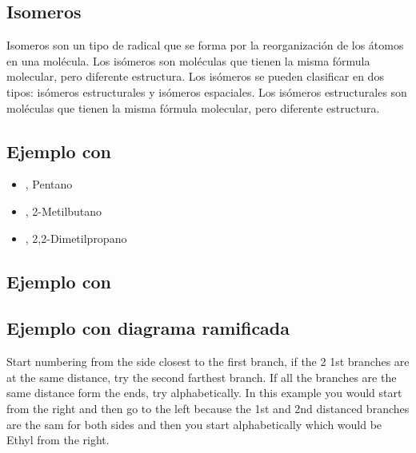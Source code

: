 \subsection{Isomeros}
Isomeros son un tipo de radical que se forma por la reorganización de los átomos en una molécula. Los isómeros son moléculas que tienen la misma fórmula molecular, pero diferente estructura. Los isómeros se pueden clasificar en dos tipos: isómeros estructurales y isómeros espaciales. Los isómeros estructurales son moléculas que tienen la misma fórmula molecular, pero diferente estructura.
\subsection*{Ejemplo con }
\begin{itemize}
    \item {}, Pentano
    \item {}, 2-Metilbutano
    \item {}, 2,2-Dimetilpropano
\end{itemize}
\qquad
\subsection*{Ejemplo con }
\qquad
\subsection*{Ejemplo con diagrama ramificada}
\begin{center}
\end{center}
Start numbering from the side closest to the first branch, if the 2 1st branches are at the same distance, try the second farthest branch. If all the branches are the same distance form the ends, try alphabetically. In this example you would start from the right and then go to the left because the 1st and 2nd distanced branches are the sam for both sides and then you start alphabetically which would be Ethyl from the right.